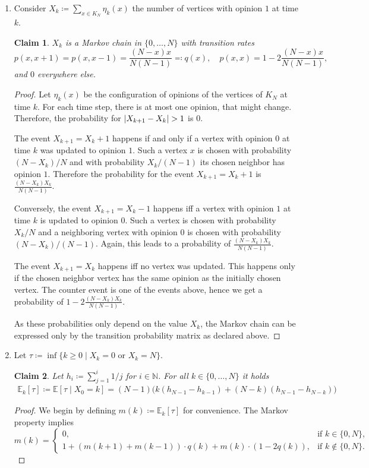 \documentclass[a4paper]{amsart}
\theoremstyle{theorem}
\newtheorem{claim}{Claim}
\theoremstyle{definition}
\newcommand{\N}{\mathbb{N}}
\newcommand{\E}{\mathbb{E}}
\DeclarePairedDelimiter\abs{\lvert}{\rvert}%
\begin{document}
\begin{enumerate}[label=\alph*)]
	\item  Consider $X_k \coloneqq \sum_{x\in K_N} \eta_k(x)$ the number of vertices with opinion $1$ at time $k$.
	\begin{claim}
		$X_k$ is a Markov chain in $\{ 0, \dots, N \}$ with transition rates
		$$p(x,x+1) = p(x, x-1) = \frac{(N-x) x}{N (N -1)}\eqqcolon q(x), \hspace{1em}p(x,x) = 1 - 2\frac{(N-x) x}{N (N -1)},$$
		and $0$ everywhere else.
	\end{claim}
	\begin{proof}
		Let $\eta_k(x)$ be the configuration of opinions of the vertices of $K_N$ at time $k$.
		For each time step, there is at most one opinion, that might change.
		Therefore, the probability for $\abs{X_{k+1} - X_k} > 1$ is $0$.
		
		The event $X_{k+1} = X_k + 1$ happens if and only if a vertex with opinion $0$ at time $k$ was updated to opinion $1$.
		Such a vertex $x$ is chosen with probability $(N - X_k)/N$ and with probability $X_k / (N-1)$ its chosen neighbor has opinion $1$.
		Therefore the probability for the event $X_{k+1} = X_k + 1$ is $\frac{(N-X_k)X_k}{N(N-1)}$.
		
		Conversely, the event $X_{k+1} = X_k - 1$ happens iff a vertex with opinion $1$ at time $k$ is updated to opinion $0$.
		Such a vertex is chosen with probability $X_k/N$ and a neighboring vertex with opinion $0$ is chosen with probability $(N-X_k)/(N-1)$.
		Again, this leads to a probability of $\frac{(N-X_k)X_k}{N(N-1)}$.
		
		The event $X_{k+1} = X_k$ happens iff no vertex was updated.
		This happens only if the chosen neighbor vertex has the same opinion as the initially chosen vertex.
		The counter event is one of the events above, hence we get a probability of $1 - 2\frac{(N-X_k)X_k}{N(N-1)}$.
		
		As these probabilities only depend on the value $X_k$, the Markov chain can be expressed only by the transition probability matrix as declared above.
	\end{proof}
	
	\item Let $\tau \coloneqq \inf\{ k \geq 0 \mid X_k = 0 \text{~or~} X_k = N\}$.
	\begin{claim}
		Let $h_i\coloneqq \sum_{j=1}^i 1/j$ for $i\in\N$.
		For all $k\in\{0, \dots, N\}$ it holds 
		\begin{align*}
		\E_k[\tau] \coloneqq \E[\tau \mid X_0 = k] = (N-1) \Big(k(h_{N-1} - h_{k-1}) + (N-k) (h_{N-1} - h_{N-k}) \Big)
		\end{align*}
	\end{claim}
	\begin{proof}
		We begin by defining $m(k)\coloneqq \E_k[\tau]$ for convenience.
		The Markov property implies $$m(k) =\begin{cases}
			0, &\text{if $k\in\{0, N\}$,} \\
			1 + (m(k+1) + m(k-1))\cdot q(k) + m(k)\cdot (1-2q(k)), &\text{if $k\notin\{0,N\}$.}
		\end{cases}$$
		

\end{proof}
\end{enumerate}
\end{document}
